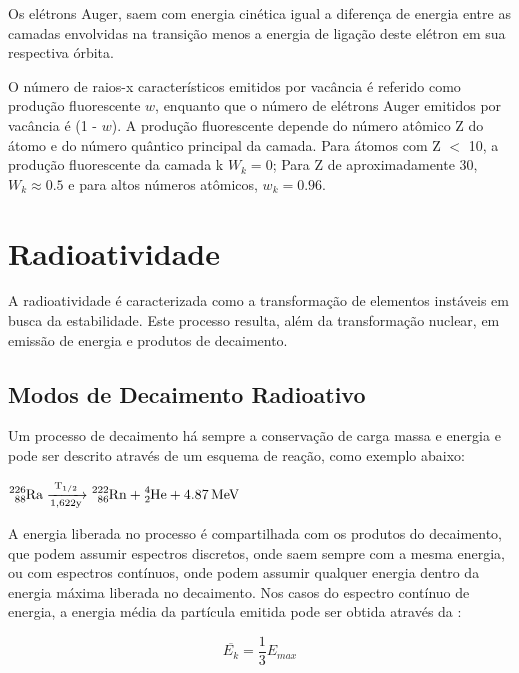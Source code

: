 \documentclass[11pt,a4paper]{article}
\newcounter{exemplo}
\begin{document}
                Os elétrons Auger, saem com energia cinética igual a diferença de energia entre as camadas envolvidas na transição menos a energia de ligação deste elétron em sua respectiva órbita.


                O número de raios-x característicos emitidos por vacância é referido como produção fluorescente $w$, enquanto que o número de elétrons Auger emitidos por vacância é (1 - $w$). A produção fluorescente depende do número atômico Z do átomo e do número quântico principal da camada. Para átomos com Z $<$ 10, a produção fluorescente da camada k $W_k = 0$; Para Z de aproximadamente 30, $W_k \approx 0.5$ e para altos números atômicos, $w_k = 0.96$.


    \section{Radioatividade}

        A radioatividade é caracterizada como a transformação de elementos instáveis em busca da estabilidade. Este processo resulta, além da transformação nuclear, em emissão de energia e produtos de decaimento.
        
        
        \subsection{Modos de Decaimento Radioativo}

            Um processo de decaimento há sempre a conservação de carga massa e energia e pode ser descrito através de um esquema de reação, como exemplo abaixo:

            \begin{center}
                $\ce{^{226}_{88}Ra ->[{T_{1/2}}][{1,622y}] ^{222}_{86}Rn + ^{4}_{2}He + 4.87 MeV}$
            \end{center}

            A energia liberada no processo é compartilhada com os produtos do decaimento, que podem assumir espectros discretos, onde saem sempre com a mesma energia, ou com espectros contínuos, onde podem assumir qualquer energia dentro da energia máxima liberada no decaimento. Nos casos do espectro contínuo de energia, a energia média da partícula emitida pode ser obtida através da :
            
                \begin{equation}
                    \overline{E_k} = \frac{1}{3} E_{max}
                \end{equation}
            
\end{document}
